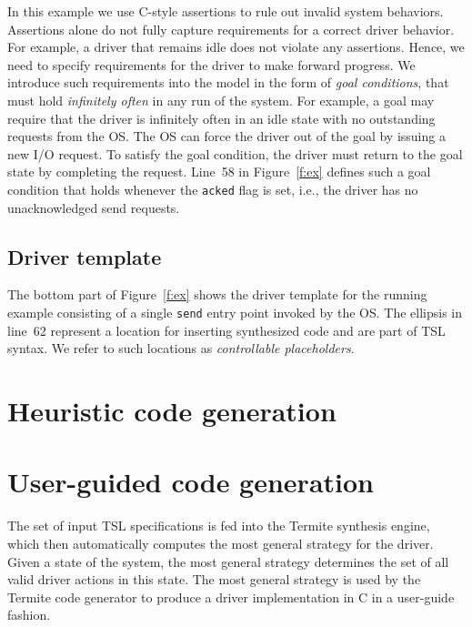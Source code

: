 \documentclass[a4paper,twoside,openright,11pt]{book}
\newcommand{\termite}{Termite\xspace}
\newcommand{\tsl}{TSL\xspace}
\theoremstyle{definition}
\newcommand{\src}[1]{\texttt{\small #1}}
\begin{document}
In this example we use C-style assertions to rule out invalid system behaviors.  Assertions alone do not fully capture requirements for a correct driver behavior.  For example, a driver that remains idle does not violate any assertions.  Hence, we need to specify requirements for the driver to make forward progress.  We introduce such requirements into the model in the form of \emph{goal conditions}, that must hold \emph{infinitely often} in any run of the system.  For example, a goal may require that the driver is infinitely often in an idle state with no outstanding requests from the OS.  The OS can force the driver out of the goal by issuing a new I/O request.  To satisfy the goal condition, the driver must return to the goal state by completing the request.  Line~58 in Figure~\ref{f:ex} defines such a goal condition that holds whenever the \src{acked} flag is set, i.e., the driver has no unacknowledged send requests.

\subsection{Driver template}

The bottom part of Figure~\ref{f:ex} shows the driver template for the running example consisting of a single \src{send} entry point invoked by the OS.  The ellipsis in line~62 represent a location for inserting synthesized code and are part of \tsl syntax.  We refer to such locations as \emph{controllable placeholders}. 

\section{Heuristic code generation}

\section{User-guided code generation}
\label{s:user-guided}

The set of input \tsl specifications is fed into the \termite synthesis engine, which then automatically computes the most general strategy for the driver.  Given a state of the system, the most general strategy determines the set of all valid driver actions in this state.  The most general strategy is used by the \termite code generator to produce a driver implementation in C in a user-guide fashion.
\end{document}
